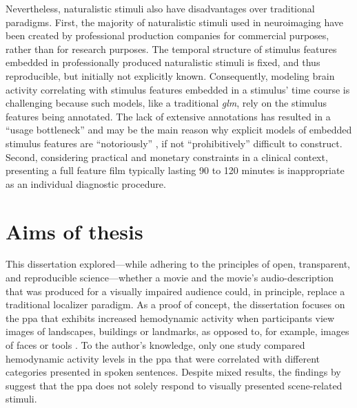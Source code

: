 Nevertheless, naturalistic stimuli also have disadvantages over traditional
paradigms.
First, the majority of naturalistic stimuli used in neuroimaging have been
created by professional production companies for commercial purposes, rather
than for research purposes.
The temporal structure of stimulus features embedded in professionally produced
naturalistic stimuli is fixed, and thus reproducible, but initially not
explicitly known.
Consequently, modeling brain activity correlating with stimulus features
embedded in a stimulus' time course is challenging
\citep{saarimaki2021naturalistic, simony2020analysis} because such models, like
a traditional \textit{\ac{glm}}, rely on the stimulus features being annotated.
The lack of extensive annotations has resulted in a ``usage bottleneck''
\citep[][p.  16]{aliko2020naturalistic} and may be the main reason why explicit
models of embedded stimulus features are ``notoriously'' \citep[][p.
1]{richard2019fast}, if not ``prohibitively'' \citep[p.
676]{nastase2019measuring} difficult to construct.
Second, considering practical and monetary constraints in a clinical context,
presenting a full feature film typically lasting 90 to 120 minutes is
inappropriate as an individual diagnostic procedure.





\section{Aims of thesis}


This dissertation explored---while adhering to the principles of
open, transparent, and reproducible science---whether a movie and the movie's
audio-description that was produced for a visually impaired audience could, in
principle, replace a traditional localizer paradigm.
As a proof of concept, the dissertation focuses on the \ac{ppa} that exhibits
increased hemodynamic activity when participants view images of landscapes,
buildings or landmarks, as opposed to, for example, images of faces or tools
\citep[s.][for reviews]{epstein2014neural, aminoff2013role}.
To the author's knowledge, only one study \citep{aziz2008modulation}
compared hemodynamic activity levels in the \ac{ppa} that were correlated with
different categories presented in spoken sentences.
%
Despite mixed results, the findings by \citet{aziz2008modulation} suggest that
the \ac{ppa} does not solely respond to visually presented scene-related stimuli.


